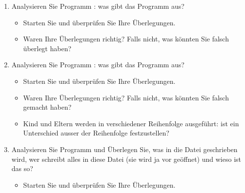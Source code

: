 \documentclass[a4paper,10pt,english]{report}
\begin{document}
\begin{enumerate}
%
\item {} 
\sphinxAtStartPar
Analysieren Sie Programm : was gibt das Programm aus?
\begin{itemize}
\item {} 
\sphinxAtStartPar
Starten Sie und überprüfen Sie Ihre Überlegungen.

\item {} 
\sphinxAtStartPar
Waren Ihre Überlegungen richtig? Falls nicht, was könnten Sie falsch überlegt haben?

\end{itemize}

\begin{sphinxVerbatim}[commandchars=\\\{\}]

\end{sphinxVerbatim}

\item {} 
\sphinxAtStartPar
Analysieren Sie Programm : was gibt das Programm aus?
\begin{itemize}
\item {} 
\sphinxAtStartPar
Starten Sie  und überprüfen Sie Ihre Überlegungen.

\item {} 
\sphinxAtStartPar
Waren Ihre Überlegungen richtig? Falls nicht, was könnten Sie falsch gemacht haben?

\item {} 
\sphinxAtStartPar
Kind und Eltern werden in verschiedener Reihenfolge ausgeführt: ist ein Unterschied ausser der Reihenfolge festzustellen?

\end{itemize}

\begin{sphinxVerbatim}[commandchars=\\\{\}]

\end{sphinxVerbatim}

\item {} 
\sphinxAtStartPar
Analysieren Sie Programm  und Überlegen Sie, was in die Datei  geschrieben wird, wer schreibt alles in diese Datei (sie wird ja vor  geöffnet) und wieso ist das so?
\begin{itemize}
\item {} 
\sphinxAtStartPar
Starten Sie  und überprüfen Sie Ihre Überlegungen.


\end{itemize}
\end{enumerate}
\end{document}
